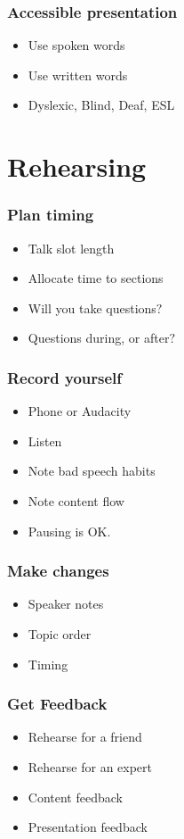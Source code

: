 \documentclass{beamer}
\begin{document}
\begin{frame}[fragile]
\frametitle{Accessible presentation}
\begin{itemize}
\item Use spoken words
\item Use written words
\item Dyslexic, Blind, Deaf, ESL
\end{itemize}
\end{frame}

\section{Rehearsing}

\begin{frame}[fragile]
\tableofcontents[currentsection]
\end{frame}

\begin{frame}[fragile]
\frametitle{Plan timing}
\begin{itemize}
\item Talk slot length
\item Allocate time to sections
\item Will you take questions$?$
\item Questions during, or after$?$
\end{itemize}
\end{frame}

\begin{frame}[fragile]
\frametitle{Record yourself}
\begin{itemize}
\item Phone or Audacity
\item Listen
\item Note bad speech habits
\item Note content flow
\item Pausing is OK.
\end{itemize}
\end{frame}

\begin{frame}[fragile]
\frametitle{Make changes}
\begin{itemize}
\item Speaker notes
\item Topic order
\item Timing
\end{itemize}
\end{frame}

\begin{frame}[fragile]
\frametitle{Get Feedback}
\begin{itemize}
\item Rehearse for a friend
\item Rehearse for an expert
\item Content feedback
\item Presentation feedback
\end{itemize}
\end{frame}
\end{document}
